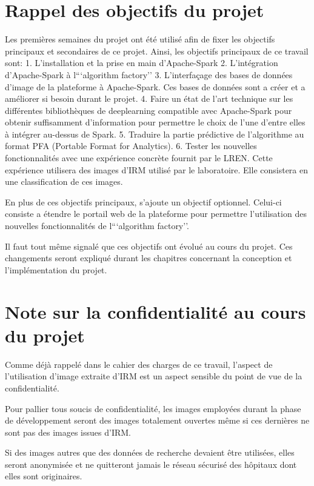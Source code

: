 \documentclass[a4paper,10pt,openany,oneside]{sphinxmanual}
\begin{document}
\section{Rappel des objectifs du projet}
\label{index:rappel-des-objectifs-du-projet}
Les premières semaines du projet ont été utilisé afin de fixer les objectifs principaux et secondaires de ce projet. Ainsi, les objectifs
principaux de ce travail sont:
1. L'installation et la prise en main d'Apache-Spark
2. L'intégration d'Apache-Spark à l```algorithm factory''
3. L'interfaçage des bases de données d'image de la plateforme à Apache-Spark. Ces bases de données sont a créer et a améliorer si besoin
durant le projet.
4. Faire un état de l'art technique sur les différentes bibliothèques de deeplearning compatible avec Apache-Spark pour obtenir suffisamment
d'information pour permettre le choix de l'une d'entre elles à intégrer au-dessus de Spark.
5. Traduire la partie prédictive de l'algorithme au format PFA (Portable Format for Analytics).
6. Tester les nouvelles fonctionnalités avec une expérience concrète fournit par le LREN. Cette expérience utilisera des images d'IRM utilisé
par le laboratoire. Elle consistera en une classification de ces images.

En plus de ces objectifs principaux, s'ajoute un objectif optionnel. Celui-ci consiste a étendre le portail web de la plateforme pour
permettre l'utilisation des nouvelles fonctionnalités de l```algorithm factory''.

Il faut tout même signalé que ces objectifs ont évolué au cours du projet. Ces changements seront expliqué durant les chapitres concernant
la conception et l'implémentation du projet.


\section{Note sur la confidentialité au cours du projet}
\label{index:note-sur-la-confidentialite-au-cours-du-projet}
Comme déjà rappelé dans le cahier des charges de ce travail, l’aspect de l’utilisation d’image extraite d’IRM est un aspect sensible du point
de vue de la confidentialité.

Pour pallier tous soucis de confidentialité, les images employées durant la phase de développement seront des images totalement ouvertes même
si ces dernières ne sont pas des images issues d’IRM.

Si des images autres que des données de recherche devaient être utilisées, elles seront anonymisée et ne quitteront jamais le réseau sécurisé des
hôpitaux dont elles sont originaires.
\end{document}

